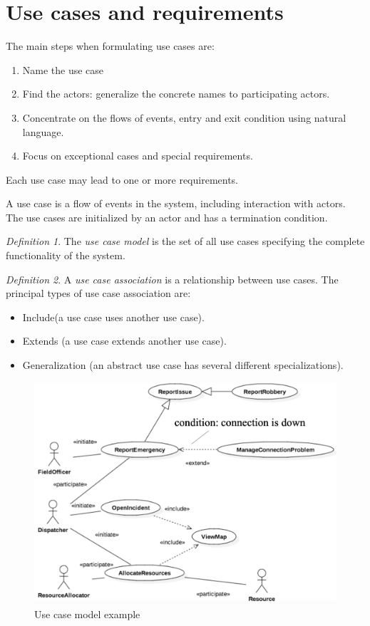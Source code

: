 \documentclass[12pt, a4paper]{report}
\theoremstyle{remark}
\newtheorem*{remark}{Definition}
\begin{document}
\section{Use cases and requirements}
    The main steps when formulating use cases are: 
    \begin{enumerate}
        \item Name the use case
        \item Find the actors: generalize the concrete names to participating actors.
        \item Concentrate on the flows of events, entry and exit condition using natural language.
        \item Focus on exceptional cases and special requirements.
    \end{enumerate}
    Each use case may lead to one or more requirements.
    \par
    A use case is a flow of events in the system, including interaction with actors. The use cases are initialized by an actor and has a termination condition. 
    \begin{remark}
        The \emph{use case model} is the set of all use cases specifying the complete functionality of the system. 
    \end{remark}
    \begin{remark}
        A \emph{use case association} is a relationship between use cases. The principal types of use case association are: 
        \begin{itemize}
            \item Include(a use case uses another use case).
            \item Extends (a use case extends another use case).
            \item Generalization (an abstract use case has several different specializations).
        \end{itemize}
    \end{remark}
    \begin{figure}
        \centering
        \includegraphics[width=0.5\linewidth]{images/usecase.png}
        \caption{Use case model example}
    \end{figure}
\end{document}
